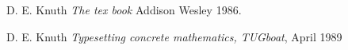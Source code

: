 \documentclass{article}
\begin{document}














 \begin{thebibliography}{1}

   D. E. Knuth {\em The tex book }  Addison Wesley 1986.

    D. E. Knuth {\em Typesetting concrete mathematics, TUGboat}, April 1989

  \end{thebibliography}
\end{document}
